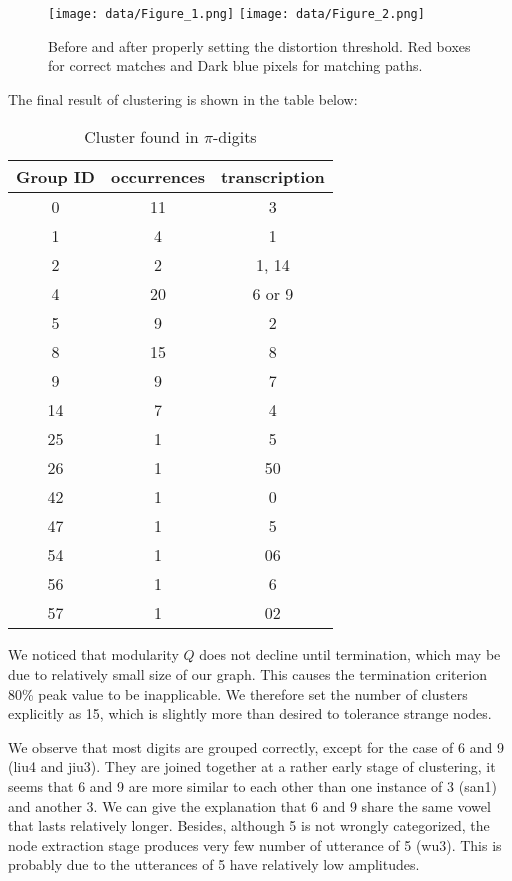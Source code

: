 \documentclass{article}
\begin{document}
    \begin{figure}
    \texttt{[image: data/Figure\_1.png]}
    \texttt{[image: data/Figure\_2.png]}
    \caption{Before and after properly setting the distortion threshold. Red boxes for correct matches and 
    Dark blue pixels for matching paths.}    
    \end{figure}
\FloatBarrier
    The final result of clustering is shown in the table below:
    \begin{table}[h]
    \centering
    \begin{tabular}{ccc}
    \hline
        Group ID &     occurrences   & transcription\\
    \hline
        0   &      11 &3\\
        1   &       4&1\\
        2   &       2&1, 14\\
        4   &       20&6 or 9\\
        5   &       9&2\\
        8   &       15&8\\
        9   &       9&7\\
        14  &       7&4\\
        25  &       1&5\\
        26  &       1&50\\
        42  &       1&0\\
        47  &       1&5\\
        54  &       1&06\\
        56  &       1&6\\
        57  &       1&02\\
    \hline
    \end{tabular}
    \caption{Cluster found in $\pi$-digits}
    \end{table}

    We noticed that modularity $Q$ does not decline until termination, which may be due to relatively small size
    of our graph. This causes the termination criterion 80\% peak value to be inapplicable. We therefore set 
    the number of clusters explicitly as 15, which is slightly more than desired to tolerance strange nodes. 
    
    We observe that most digits are grouped correctly, except 
    for the case of 6 and 9 (liu4 and jiu3). They are joined together at a rather early stage of clustering, 
    it seems that 6 and 9 are more similar to each other than one instance of 3 (san1) and another 3. We can 
    give the explanation that 6 and 9 share the same vowel that lasts relatively longer. Besides, although 5 is 
    not wrongly categorized, the node extraction stage produces very few number of utterance of 5 (wu3). This 
    is probably due to the utterances of 5 have relatively low amplitudes.
\end{document}
